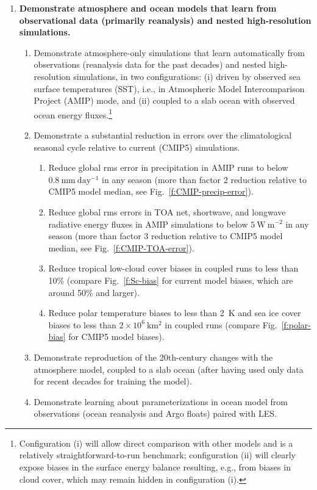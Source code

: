 \documentclass{article}
\begin{document}
\begin{enumerate}
    \item \textbf{Demonstrate atmosphere and ocean models that learn from observational data (primarily reanalysis) and nested high-resolution simulations.}
    \begin{enumerate}
        \item Demonstrate atmosphere-only simulations that learn automatically from observations (reanalysis data for the past decades) and nested high-resolution simulations, in two configurations: (i) driven by observed sea surface temperatures (SST), i.e., in Atmospheric Model Intercomparison Project (AMIP) mode, and (ii) coupled to a slab ocean with observed ocean energy fluxes.\footnote{Configuration (i) will allow direct comparison with other models and is a relatively straightforward-to-run benchmark; configuration (ii) will clearly expose biases in the surface energy balance resulting, e.g., from biases in cloud cover, which may remain hidden in configuration (i).}
        \item Demonstrate a substantial reduction in errors over the climatological seasonal cycle relative to current (CMIP5) simulations. 
        \begin{enumerate}
            \item Reduce global rms error in precipitation in AMIP runs to below $0.8~\mathrm{mm~day^{-1}}$ in any season (more than factor 2 reduction relative to CMIP5 model median, see Fig.~\ref{f:CMIP-precip-error}).
            \item Reduce global rms errors in TOA net, shortwave, and longwave radiative energy fluxes in AMIP simulations to below $5~\mathrm{W~m^{-2}}$ in any season (more than factor 3 reduction relative to CMIP5 model median, see Fig.~\ref{f:CMIP-TOA-error}).
            \item Reduce tropical low-cloud cover biases in coupled runs to less than 10\% (compare Fig.~\ref{f:Sc-bias} for current model biases, which are around 50\% and larger).
            \item Reduce polar temperature biases to less than 2~K and sea ice cover biases to less than $2\times 10^6~\mathrm{km^2}$ in coupled runs (compare Fig.~\ref{f:polar-bias} for CMIP5 model biases).
             \end{enumerate}
                \item Demonstrate reproduction of the 20th-century changes with the atmosphere model, coupled to a slab ocean (after having used only data for recent decades for training the model).
        \item Demonstrate learning about parameterizations in ocean model from observations (ocean reanalysis and Argo floats) paired with LES.

\end{enumerate}
\end{enumerate}
\end{document}

